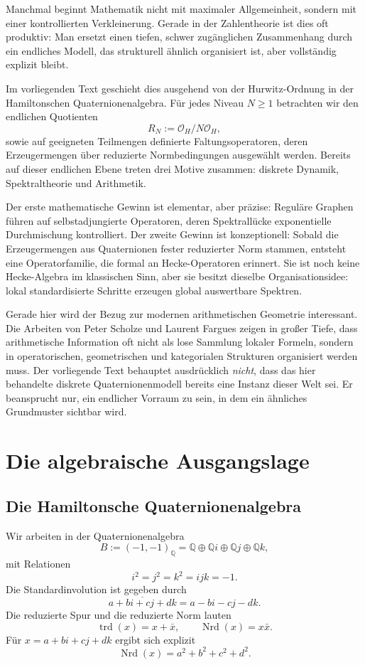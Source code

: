\documentclass[12pt,a4paper]{article}
\newcommand{\trd}{\operatorname{trd}}
\theoremstyle{plain}
\theoremstyle{definition}
\theoremstyle{remark}
\newcommand{\Q}{\mathbb{Q}}
\newcommand{\OH}{\mathcal{O}_H}
\newcommand{\Nrd}{\operatorname{Nrd}}
\begin{document}
	Manchmal beginnt Mathematik nicht mit maximaler Allgemeinheit,
	sondern mit einer kontrollierten Verkleinerung.
	Gerade in der Zahlentheorie ist dies oft produktiv:
	Man ersetzt einen tiefen, schwer zugänglichen Zusammenhang
	durch ein endliches Modell, das strukturell ähnlich organisiert ist,
	aber vollständig explizit bleibt.
	
	Im vorliegenden Text geschieht dies ausgehend von der Hurwitz-Ordnung
	in der Hamiltonschen Quaternionenalgebra.
	Für jedes Niveau \(N\ge 1\) betrachten wir den endlichen Quotienten
	\[
	R_N := \OH / N\OH,
	\]
	sowie auf geeigneten Teilmengen definierte Faltungsoperatoren,
	deren Erzeugermengen über reduzierte Normbedingungen ausgewählt werden.
	Bereits auf dieser endlichen Ebene treten drei Motive zusammen:
	diskrete Dynamik, Spektraltheorie und Arithmetik.
	
	Der erste mathematische Gewinn ist elementar, aber präzise:
	Reguläre Graphen führen auf selbstadjungierte Operatoren,
	deren Spektrallücke exponentielle Durchmischung kontrolliert.
	Der zweite Gewinn ist konzeptionell:
	Sobald die Erzeugermengen aus Quaternionen fester reduzierter Norm
	stammen, entsteht eine Operatorfamilie, die formal an Hecke-Operatoren erinnert.
	Sie ist noch keine Hecke-Algebra im klassischen Sinn,
	aber sie besitzt dieselbe Organisationsidee:
	lokal standardisierte Schritte erzeugen global auswertbare Spektren.
	
	Gerade hier wird der Bezug zur modernen arithmetischen Geometrie interessant.
	Die Arbeiten von Peter Scholze und Laurent Fargues zeigen in großer Tiefe,
	dass arithmetische Information oft nicht als lose Sammlung lokaler Formeln,
	sondern in operatorischen, geometrischen und kategorialen Strukturen
	organisiert werden muss.
	Der vorliegende Text behauptet ausdrücklich \emph{nicht},
	dass das hier behandelte diskrete Quaternionenmodell bereits eine Instanz
	dieser Welt sei.
	Er beansprucht nur, ein endlicher Vorraum zu sein,
	in dem ein ähnliches Grundmuster sichtbar wird.
	
	\section{Die algebraische Ausgangslage}
	
	\subsection{Die Hamiltonsche Quaternionenalgebra}
	
	Wir arbeiten in der Quaternionenalgebra
	\[
	B := (-1,-1)_{\Q}
	= \Q \oplus \Q i \oplus \Q j \oplus \Q k,
	\]
	mit Relationen
	\[
	i^2=j^2=k^2=ijk=-1.
	\]
	Die Standardinvolution ist gegeben durch
	\[
	\overline{a+bi+cj+dk}=a-bi-cj-dk.
	\]
	Die reduzierte Spur und die reduzierte Norm lauten
	\[
	\trd(x)=x+\bar{x}, \qquad \Nrd(x)=x\bar{x}.
	\]
	Für \(x=a+bi+cj+dk\) ergibt sich explizit
	\[
	\Nrd(x)=a^2+b^2+c^2+d^2.
	\]
	
\end{document}
